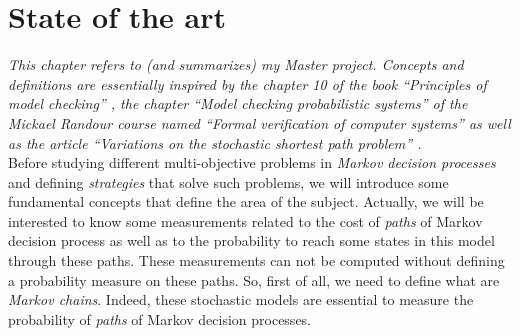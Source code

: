 \chapter{State of the art}
\textit{This chapter refers to (and summarizes) my Master project. Concepts and definitions are essentially inspired by the chapter 10 of the book ``Principles of model checking'' \cite{PMC}, the chapter ``Model checking probabilistic systems'' of the Mickael Randour course named ``Formal verification of computer systems'' \cite{MRV} as well as the article ``Variations on the stochastic shortest path problem'' \cite{DBLP:journals/corr/RandourRS14a}.} \\

Before studying different multi-objective problems in \textit{Markov decision
processes} and defining \textit{strategies} that solve such problems, we will introduce some fundamental concepts that define the area of the subject.
Actually, we will be interested to know some measurements related to the cost of \textit{paths} of Markov decision process as well as to the probability to reach some states in this model through these paths.
These measurements can not be computed without defining a probability measure on these paths.
So, first of all, we need to define what are \textit{Markov chains}. Indeed, these
stochastic models are essential to measure the probability of \textit{paths} of Markov decision processes.

